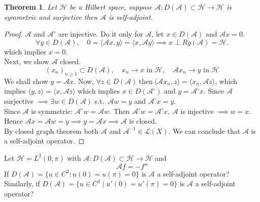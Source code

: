 \documentclass[12pt, oneside]{book}
\newtheorem{theo}{Theorem}[section]
\begin{document}
\begin{theo}
	Let $\mathscr{H}$ be a Hilbert space, suppose $\mathscr{A}:D(\mathscr{A})\subset \mathscr{H}\to \mathscr{H}$ is symmetric and surjective then $\mathscr{A}$ is self-adjoint.
\end{theo}
\begin{proof}
$\mathscr{A}$ and $\mathscr{A}^{\circ}$ are injective. Do it only for $\mathscr{A}$, let $x \in D(\mathscr{A})$ and $\mathscr{A}x = 0$.
\[
\forall y \in D(\mathscr{A}),
\quad
0 = \langle \mathscr{A}x, y \rangle
= \langle x, \mathscr{A}y \rangle
\implies x \perp Rg(\mathscr{A}) = \mathscr{H}.
\]
which implies $x=0$.\\
Next, we show $\mathscr{A}$ closed. 
\[
(x_n)_{n \ge 1} \subset D(\mathscr{A}),
\quad
x_n \to x \text{ in } \mathscr{H},
\quad
\mathscr{A}x_n \to y \text{ in } \mathscr{H}
\]
We shall show $y = \mathscr{A}x$. Now,
$
\forall z \in D(\mathscr{A})\ \text{then} \ \langle \mathscr{A}x_n, z \rangle
= \langle x_n, \mathscr{A}z \rangle
$, which implies
$
\langle y, z \rangle = \langle x, \mathscr{A}z \rangle
$ which implies $x \in D(\mathscr{A}^{\circ}) \text{ and } y = \mathscr{A}^{\circ}x$. Since
$\mathscr{A}$ surjective $\implies \exists w \in D(\mathscr{A})$
s.t.\ $\mathscr{A}w = y$ and $\mathscr{A}^{\circ}x = y$.\\
Since $\mathscr{A}$ is symmetric: $\mathscr{A}^{\circ}w = \mathscr{A}w$.
Then $\mathscr{A}^{\circ}w = \mathscr{A}^{\circ}x$, $\mathscr{A}$ is injective $\implies w = x$.
Hence $\mathscr{A}x = \mathscr{A}w = y \implies y = \mathscr{A}x \implies \mathscr{A}$ is closed.\\
By closed graph theorem both $\mathscr{A}$ and $\mathscr{A}^{-1} \in \mathcal{L}(X)$. We can conclude that $\mathscr{A}$ is a self-adjoint operator.
\end{proof}
\begin{exercise}{}{}
	Let $
	\mathscr{H} = L^2(0,\pi)$ with $
	\mathscr{A} : D(\mathscr{A}) \subset \mathscr{H} \to \mathscr{H}$ and
	\vspace{-2mm}
	\[
	\mathscr{A}f = -f''
	\]
	If $
	D(\mathscr{A}) = \{ u \in C^2 : u(0) = u(\pi) = 0 \}
	$ is $\mathscr{A}$ a self-adjoint operator?\\
Similarly, if $
	D(\mathscr{A}) = \{ u \in C^2 \mid u'(0) = u'(\pi) = 0 \}
	$ is $\mathscr{A}$ a self-adjoint operator?
\end{exercise}
\end{document}

